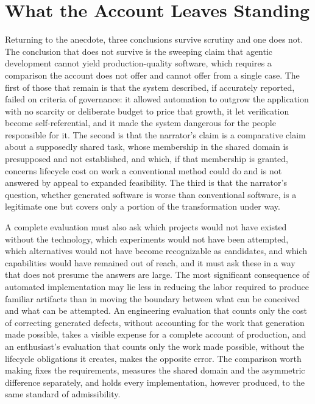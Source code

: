 \documentclass[11pt]{article}
\theoremstyle{remark}
\begin{document}
\section{What the Account Leaves Standing}

Returning to the anecdote, three conclusions survive scrutiny and one does not. The conclusion that does not survive is the sweeping claim that agentic development cannot yield production-quality software, which requires a comparison the account does not offer and cannot offer from a single case. The first of those that remain is that the system described, if accurately reported, failed on criteria of governance: it allowed automation to outgrow the application with no scarcity or deliberate budget to price that growth, it let verification become self-referential, and it made the system dangerous for the people responsible for it. The second is that the narrator's claim is a comparative claim about a supposedly shared task, whose membership in the shared domain is presupposed and not established, and which, if that membership is granted, concerns lifecycle cost on work a conventional method could do and is not answered by appeal to expanded feasibility. The third is that the narrator's question, whether generated software is worse than conventional software, is a legitimate one but covers only a portion of the transformation under way.

A complete evaluation must also ask which projects would not have existed without the technology, which experiments would not have been attempted, which alternatives would not have become recognizable as candidates, and which capabilities would have remained out of reach, and it must ask these in a way that does not presume the answers are large. The most significant consequence of automated implementation may lie less in reducing the labor required to produce familiar artifacts than in moving the boundary between what can be conceived and what can be attempted. An engineering evaluation that counts only the cost of correcting generated defects, without accounting for the work that generation made possible, takes a visible expense for a complete account of production, and an enthusiast's evaluation that counts only the work made possible, without the lifecycle obligations it creates, makes the opposite error. The comparison worth making fixes the requirements, measures the shared domain and the asymmetric difference separately, and holds every implementation, however produced, to the same standard of admissibility.
\end{document}
